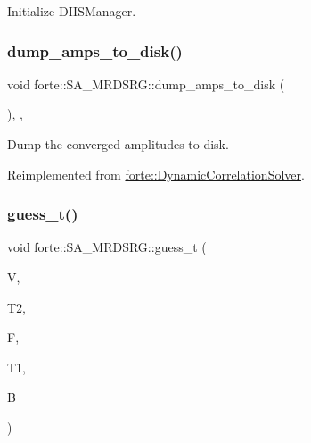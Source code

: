 Initialize D\+I\+I\+S\+Manager. 

\mbox{\label{classforte_1_1_s_a___m_r_d_s_r_g_a53d329b17db498bf6c3e6c3984195bcb}} 
\subsubsection{\texorpdfstring{dump\+\_\+amps\+\_\+to\+\_\+disk()}{dump\_amps\_to\_disk()}}
{\footnotesize\ttfamily void forte\+::\+S\+A\+\_\+\+M\+R\+D\+S\+R\+G\+::dump\+\_\+amps\+\_\+to\+\_\+disk (\begin{DoxyParamCaption}{ }\end{DoxyParamCaption})\hspace{0.3cm}{\ttfamily [override]}, {\ttfamily [protected]}, {\ttfamily [virtual]}}



Dump the converged amplitudes to disk. 



Reimplemented from \mbox{\hyperlink{classforte_1_1_dynamic_correlation_solver_a504b343c559a62b9d13ecf8cec44f3d2}{forte\+::\+Dynamic\+Correlation\+Solver}}.

\mbox{\label{classforte_1_1_s_a___m_r_d_s_r_g_a68cda5896b0931d0be1cbc4f6ca521d2}} 
\subsubsection{\texorpdfstring{guess\+\_\+t()}{guess\_t()}}
{\footnotesize\ttfamily void forte\+::\+S\+A\+\_\+\+M\+R\+D\+S\+R\+G\+::guess\+\_\+t (\begin{DoxyParamCaption}\item[{Blocked\+Tensor \&}]{V,  }\item[{Blocked\+Tensor \&}]{T2,  }\item[{Blocked\+Tensor \&}]{F,  }\item[{Blocked\+Tensor \&}]{T1,  }\item[{Blocked\+Tensor \&}]{B }\end{DoxyParamCaption})\hspace{0.3cm}{\ttfamily [protected]}}



